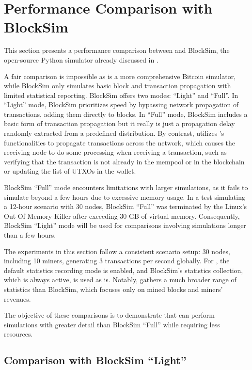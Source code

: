 \section{Performance Comparison with BlockSim}\label{sec:comparison}

This section presents a performance comparison between \iblock{} and BlockSim,
the open-source Python simulator already discussed in 
\cite{blocksim}.

A fair comparison is impossible as \iblock{} is a more comprehensive Bitcoin
simulator, while BlockSim only simulates basic block and transaction
propagation with limited statistical reporting. BlockSim offers two modes:
``Light'' and ``Full''. In ``Light'' mode, BlockSim prioritizes speed by
bypassing network propagation of transactions, adding them directly to blocks.
In ``Full'' mode, BlockSim includes a basic form of transaction propagation but
it really is just a propagation delay randomly extracted from a predefined
distribution. By contrast, \iblock{} utilizes \omnetpp's functionalities to
propagate transactions across the network, which causes the receiving node to
do some processing when receiving a transaction, such as verifying that the
transaction is not already in the mempool or in the blockchain or updating the
list of UTXOs in the wallet.

BlockSim ``Full'' mode encounters limitations with larger simulations, as it
fails to simulate beyond a few hours due to excessive memory usage. In a test
simulating a 12-hour scenario with 30 nodes, BlockSim ``Full'' was terminated
by the Linux's Out-Of-Memory Killer after exceeding 30 GB of virtual memory.
Consequently, BlockSim ``Light'' mode will be used for comparisons involving
simulations longer than a few hours.

The experiments in this section follow a consistent scenario setup: 30 nodes,
including 10 miners, generating 3 transactions per second globally. For
\iblock{}, the default statistics recording mode is enabled, and BlockSim's
statistics collection, which is always active, is used as is. Notably,
\iblock{} gathers a much broader range of statistics than BlockSim, which
focuses only on mined blocks and miners' revenues.

The objective of these comparisons is to demonstrate that \iblock{} can perform
simulations with greater detail than BlockSim ``Full'' while requiring less
resources.

\subsection{Comparison with BlockSim ``Light''}

